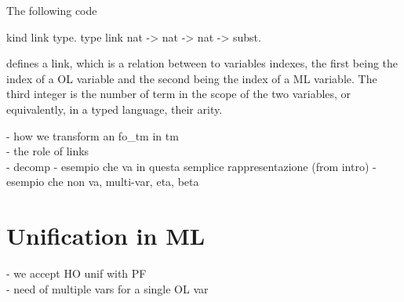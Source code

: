 \documentclass[sigconf,natbib=false]{acmart}
\begin{document}
The following code
\begin{elpicode}
  kind link type.
  type link nat -> nat -> nat -> subst.
\end{elpicode}

\noindent
defines a link, which is a relation between to variables indexes, the first
being the index of a OL variable and the second being the index of a ML
variable. The third integer is the number of term in the
scope of the two variables, or equivalently, in a typed language, their arity. 

\noindent
- how we transform an fo\_tm in tm \\
- the role of links \\
- decomp
- esempio che va in questa semplice rappresentazione (from intro)
- esempio che non va, multi-var, eta, beta

\section{Unification in ML}

- we accept HO unif with PF \\
- need of multiple vars for a single OL var












\end{document}
